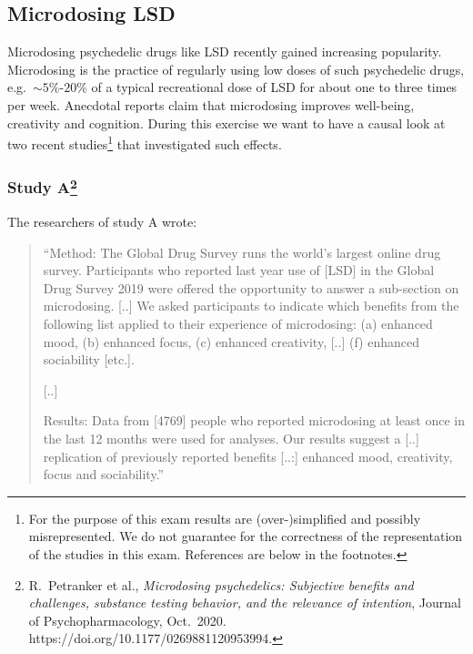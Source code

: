 \subsection{Microdosing LSD}

Microdosing psychedelic drugs like LSD recently gained increasing popularity.
Microdosing is the practice of regularly using low doses of such psychedelic drugs, e.g.\ $\sim5\%$-$20\%$ of a typical recreational dose of LSD for about
one to three times per week. Anecdotal reports claim that microdosing improves well-being, creativity and cognition. 
During this exercise we want to have a causal look at two recent studies\footnote{For the purpose of this exam results are (over-)simplified and possibly misrepresented. We do not guarantee for the correctness of the representation of the studies in this exam. References are below in the footnotes.} that investigated such effects.

\subsubsection*{Study A\footnote{R.\ Petranker et al., \textit{Microdosing psychedelics: Subjective benefits and challenges, substance testing behavior, and the relevance of intention}, Journal of Psychopharmacology, Oct.\ 2020. https://doi.org/10.1177/0269881120953994.}}

The researchers of study A wrote:
\begin{quote}
``Method: The Global Drug Survey runs the world's largest online drug survey. Participants who reported last 
year use of [LSD] in the Global Drug Survey 2019 were offered the opportunity 
to answer a sub-section on microdosing. 
  [..] 
  We asked participants to indicate which benefits from the following 
list applied to their experience of microdosing: (a) enhanced mood, (b) enhanced focus, (c) enhanced creativity, [..] (f) enhanced sociability [etc.].

  [..]

Results: Data from [4769] people who reported microdosing at least once in the last 12 months were used for analyses.
Our results suggest a [..] replication of previously reported benefits [..:] enhanced mood, creativity, focus and sociability.''
\end{quote}

